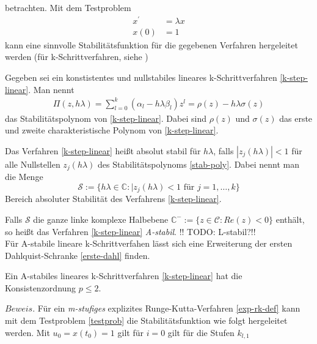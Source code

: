 betrachten. Mit dem Testproblem
\begin{align}
    x^{\prime} &= \lambda x \nonumber \\
    x(0) &= 1   \label{testprob}
\end{align}
kann eine sinnvolle Stabilitätsfunktion für die gegebenen Verfahren hergeleitet werden
(für k-Schrittverfahren, siehe \cite[103-105]{stykelSkriptZurVorlesung2020})\\
\begin{definition}
    Gegeben sei ein konstistentes und nullstabiles lineares k-Schrittverfahren \eqref{k-step-linear}. Man
    nennt
    \begin{align}
        \Pi(z,h \lambda) = \sum_{l=0}^{k} (\alpha_l - h \lambda \beta_l) z^l = \rho(z) - h \lambda \sigma(z)
        \label{stab-poly}
    \end{align}
    das Stabilitätspolynom von \eqref{k-step-linear}. Dabei sind $\rho(z)$ und $\sigma(z)$ das erste und zweite
    charakteristische Polynom von \eqref{k-step-linear}.\\
\end{definition}
\begin{definition}
    Das Verfahren \eqref{k-step-linear} heißt absolut stabil für $h\lambda$, falls $|z_j(h\lambda)|<1$ für alle
    Nullstellen $z_j(h\lambda)$ des Stabilitätspolynoms \eqref{stab-poly}. Dabei nennt man die Menge
    \[
        \mathcal{S} := \{ h \lambda \in \mathbb{C} : |z_j(h\lambda) < 1 \text{ für } j = 1, \dots, k \}
    \]
    Bereich absoluter Stabilität des Verfahrens \eqref{k-step-linear}.
\end{definition}
Falls $\mathcal{S}$ die ganze linke komplexe Halbebene $\mathbb{C}^{-}:= \{ z \in \mathcal{C}: Re(z) < 0 \} $ enthält,
so heißt das Verfahren \eqref{k-step-linear} \textit{A-stabil}. !! TODO: L-stabil?!! \\
Für A-stabile lineare k-Schrittverfahen lässt sich eine Erweiterung der ersten Dahlquist-Schranke \eqref{erste-dahl}
finden.
\begin{satz}
    Ein A-stabiles lineares k-Schrittverfahren \eqref{k-step-linear} hat die Konsistenzordnung $p \leq 2$.
\end{satz}
$Beweis.$ \cite[355-358]{peterdeuflhardfolkmarbornemannNumerischeMathematikGewohnliche}
Für ein \textit{m-stufiges} explizites Runge-Kutta-Verfahren \eqref{exp-rk-def} kann mit dem Testproblem
\eqref{testprob} die Stabilitätsfunktion wie folgt hergeleitet werden. Mit $u_0=x(t_0)=1$ gilt für $i=0$ gilt für die
Stufen $k_{l,1}$
